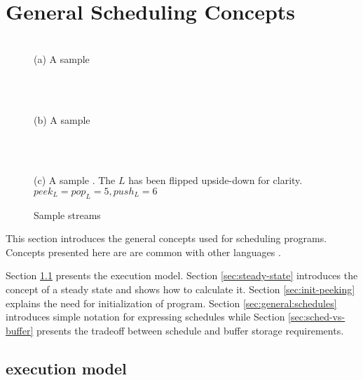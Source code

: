 \section{General {\StreamIt} Scheduling Concepts}
\label{chpt:sched-basic}

\begin{figure}
\begin{center}

\begin{minipage}{1.2in}
\centering {} \\
{\protect\small (a) A sample {\pipeline}}
\end{minipage}
~
\begin{minipage}{1.2in}
\centering {} \\
{\protect\small (b) A sample {\splitjoin}}
\end{minipage}
~
\begin{minipage}{1.5in}
\centering {} \\
{\protect\small (c) A sample {\feedbackloop}.  The $L$ {\filter}
has been flipped upside-down for clarity.\\$peek_L = pop_L = 5,
push_L = 6$}
\end{minipage}

\caption{Sample {\StreamIt} streams} \label{fig:steady-state}

\end{center}
\end{figure}

This section introduces the general concepts used for scheduling
{\StreamIt} programs.  Concepts presented here are are common with
other languages \cite{ptolemyoverview} \cite{esterel92}
\cite{lustre}.

Section \ref{sec:exec-model} presents the {\StreamIt} execution
model. Section \ref{sec:steady-state} introduces the concept of a
steady state and shows how to calculate it. Section
\ref{sec:init-peeking} explains the need for initialization of
{\StreamIt} program. Section \ref{sec:general:schedules} introduces
simple notation for expressing schedules while Section
\ref{sec:sched-vs-buffer} presents the tradeoff between schedule
and buffer storage requirements.

\subsection{{\StreamIt} execution model}
\label{sec:exec-model}


